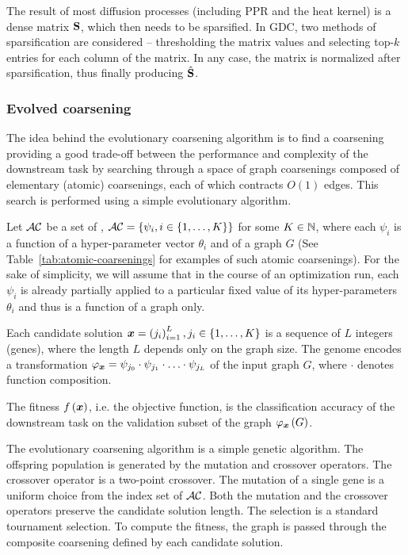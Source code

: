 The result of most diffusion processes (including PPR and the heat kernel) is a dense matrix \( \mathbf{S} \), which then needs to be sparsified. In GDC, two methods of sparsification are considered -- thresholding the matrix values and selecting top-\( k \) entries for each column of the matrix. In any case, the matrix is normalized after sparsification, thus finally producing \( \hat{\mathbf{S}} \).

\subsubsection{Evolved coarsening}

The idea behind the evolutionary coarsening algorithm is to find a coarsening providing a good trade-off between the performance and complexity of the downstream task by searching through a space of graph coarsenings composed of elementary (atomic) coarsenings, each of which contracts \( O(1) \) edges. This search is performed using a simple evolutionary algorithm.

Let \( \mathcal{AC} \) be a set of , \( \mathcal{AC} = \left\{\psi_i, i \in \left\{1, \dots, K \right\} \right\} \) for some \( K \in \mathbb{N} \), where each \( \psi_i \) is a function of a hyper-parameter vector \( \theta_i \) and of a graph \( G \) (See Table~\ref{tab:atomic-coarsenings} for examples of such atomic coarsenings). For the sake of simplicity, we will assume that in the course of an optimization run, each \( \psi_i \) is already partially applied to a particular fixed value of its hyper-parameters \( \theta_i \) and thus is a function of a graph only.

Each candidate solution \( \bm{x} = \left( j_i \right)_{i = 1}^L, j_i \in \left\{1, \dots, K \right\} \) is a sequence of \( L \) integers (genes), where the length \( L \) depends only on the graph size. The genome encodes a transformation \( \varphi_{\bm{x}} = \psi_{j_0} \cdot \psi_{j_1} \cdot \ldots \cdot \psi_{j_L} \) of the input graph \( G \), where \( \cdot \) denotes function composition.

The fitness \( f \left( \bm{x} \right) \), i.e. the objective function, is the classification accuracy of the downstream task on the validation subset of the graph \( \varphi_{\bm{x}} \left( G \right) \).

The evolutionary coarsening algorithm is a simple genetic algorithm. The offspring population is generated by the mutation and crossover operators. The crossover operator is a two-point crossover. The mutation of a single gene is a uniform choice from the index set of \( \mathcal{AC} \). Both the mutation and the crossover operators preserve the candidate solution length. The selection is a standard tournament selection. To compute the fitness, the graph is passed through the composite coarsening defined by each candidate solution.
